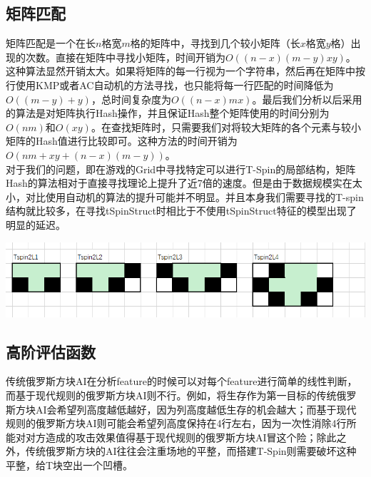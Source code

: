 \documentclass[10pt,UTF8]{article}
\newenvironment{Figure}
  {\par\medskip\noindent\minipage{\linewidth}}
  {\endminipage\par\medskip}
\begin{document}
\begin{multicols}{2}
\subsection{矩阵匹配}

矩阵匹配是一个在长$n$格宽$m$格的矩阵中，寻找到几个较小矩阵（长$x$格宽$y$格）出现的次数。直接在矩阵中寻找小矩阵，时间开销为$O((n-x)(m-y)xy)$。这种算法显然开销太大。如果将矩阵的每一行视为一个字符串，然后再在矩阵中按行使用KMP或者AC自动机的方法寻找，也只能将每一行匹配的时间降低为$O((m-y)+y)$，总时间复杂度为$O((n-x)mx)$。最后我们分析以后采用的算法是对矩阵执行Hash操作，并且保证Hash整个矩阵使用的时间分别为$O(nm)$和$O(xy)$。在查找矩阵时，只需要我们对将较大矩阵的各个元素与较小矩阵的Hash值进行比较即可。这种方法的时间开销为$O(nm+xy+(n-x)(m-y))$。\\

对于我们的问题，即在游戏的Grid中寻找特定可以进行T-Spin的局部结构，矩阵Hash的算法相对于直接寻找理论上提升了近7倍的速度。但是由于数据规模实在太小，对比使用自动机的算法的提升可能并不明显。并且本身我们需要寻找的T-spin结构就比较多，在寻找tSpinStruct时相比于不使用tSpinStruct特征的模型出现了明显的延迟。

\begin{Figure}
    \centering
    \includegraphics[width=1\textwidth]{figure/tSpinStruct.png}
\end{Figure}

\subsection{高阶评估函数}

传统俄罗斯方块AI在分析feature的时候可以对每个feature进行简单的线性判断，而基于现代规则的俄罗斯方块AI则不行。例如，将生存作为第一目标的传统俄罗斯方块AI会希望列高度越低越好，因为列高度越低生存的机会越大；而基于现代规则的俄罗斯方块AI则可能会希望列高度保持在4行左右，因为一次性消除4行所能对对方造成的攻击效果值得基于现代规则的俄罗斯方块AI冒这个险；除此之外，传统俄罗斯方块的AI往往会注重场地的平整，而搭建T-Spin则需要破坏这种平整，给T块空出一个凹槽。\\


\end{multicols}
\end{document}
